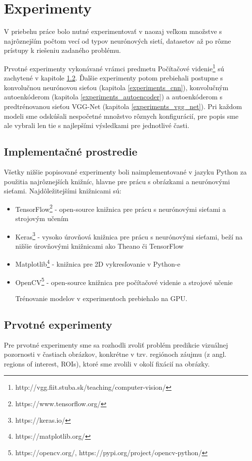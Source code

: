\newpage

\section{Experimenty}
\label{experiments}
V priebehu práce bolo nutné experimentovať v naozaj veľkom množstve s najrôznejším počtom vecí od typov neurónových sietí, datasetov až po rôzne prístupy k riešeniu zadaného problému.

Prvotné experimenty vykonávané vrámci predmetu Počítačové videnie\footnote{http://vgg.fiit.stuba.sk/teaching/computer-vision/} sú zachytené v kapitole \ref{first_experiments}. Ďalšie experimenty potom prebiehali postupne s konvolučnou neurónovou sieťou (kapitola \ref{experiments_cnn}), konvolučným autoenkóderom (kapitola \ref{experiments_autoencoder}) a autoenkóderom s predtrénovanou sieťou VGG-Net (kapitola \ref{experiments_vgg_net}). Pri každom modeli sme odskúšali nespočetné množstvo rôznych konfigurácií, pre popis sme ale vybrali len tie s najlepšími výsledkami pre jednotlivé časti. 

\subsection{Implementačné prostredie}

Všetky nižšie popisované experimenty boli naimplementované v jazyku Python za použitia najrôznejších knižníc, hlavne pre prácu s obrázkami a neurónovými sieťami. Najdôležitejšími knižnicami sú:
\begin{itemize}
	\item TensorFlow\footnote{https://www.tensorflow.org/} - open-source knižnica pre prácu s neurónovými sieťami a strojovým učením
	\item Keras\footnote{https://keras.io/} - vysoko úrovňová knižnica pre prácu s neurónovými sieťami, beží na nižšie úrovňovými knižnicami ako Theano či TensorFlow
	\item Matplotlib\footnote{https://matplotlib.org/} - knižnica pre 2D vykresľovanie v Python-e
	\item OpenCV\footnote{https://opencv.org/, https://pypi.org/project/opencv-python/} - open-source knižnica pre počítačové videnie a strojové učenie
	
	Trénovanie modelov v experimentoch prebiehalo na GPU.
\end{itemize}

\subsection{Prvotné experimenty}
\label{first_experiments}
Pre prvotné experimenty sme sa rozhodli zvoliť problém predikcie vizuálnej pozornosti v častiach obrázkov, konkrétne v tzv. regiónoch záujmu (z angl. regions of interest, ROIs), ktoré sme zvolili v okolí fixácií na obrázky.

